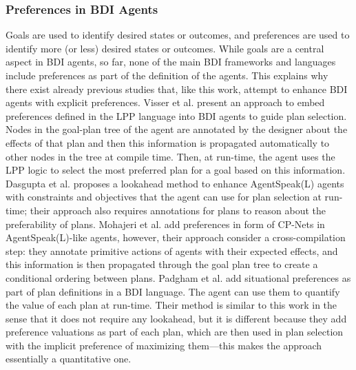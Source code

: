 \subsubsection{Preferences in BDI Agents}
Goals are used to identify desired states or outcomes, and preferences are used to identify more (or less) desired states or outcomes. While goals are a central aspect in BDI agents, so far, none of the main BDI frameworks and languages include preferences as part of the definition of the agents. This explains why there exist already previous studies that, like this work, attempt to  enhance BDI agents with explicit preferences. Visser et al. \cite{Visser2011,Visser2016} present an approach to embed preferences defined in the LPP language into BDI agents to guide plan selection. Nodes in the goal-plan tree of the agent are annotated by the designer about the effects of that plan and then this information is propagated automatically to other nodes in the tree at compile time. Then, at run-time, the agent uses the LPP logic to select the most preferred plan for a goal based on this information. 
Dasgupta et al. \cite{Dasgupta2010} proposes a lookahead method to enhance AgentSpeak(L) agents with constraints and objectives that the agent can use for plan selection at run-time; their approach also requires annotations for plans to reason about the preferability of plans. Mohajeri et al. \cite{Mohajeri2019,Mohajeri2020} add preferences in form of CP-Nets in AgentSpeak(L)-like agents, however, their approach consider a cross-compilation step: %
they annotate primitive actions of agents with their expected effects, and this information is then propagated through the goal plan tree to create a conditional ordering between plans. Padgham et al. \cite{Padgham2013} add situational preferences as part of plan definitions in a BDI language. The agent can use them to quantify the value of each plan at run-time. Their method is similar to this work in the sense that it does not require any lookahead, but it is different because they add preference valuations as part of each plan, which are then used in plan selection with the implicit preference of maximizing them---this makes the approach essentially a quantitative one.


